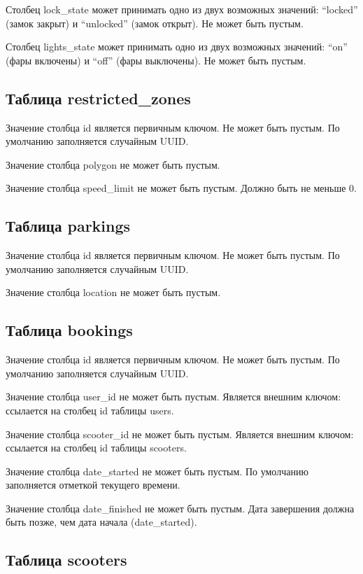 Столбец lock\_state может принимать одно из двух возможных значений: \enquote{locked} (замок закрыт) и \enquote{unlocked} (замок открыт). Не может быть пустым.

Столбец lights\_state может принимать одно из двух возможных значений: \enquote{on} (фары включены) и \enquote{off} (фары выключены). Не может быть пустым.

\subsection*{Таблица restricted\_zones}

Значение столбца id является первичным ключом. Не может быть пустым. По умолчанию заполняется случайным UUID.

Значение столбца polygon не может быть пустым.

Значение столбца speed\_limit не может быть пустым. Должно быть не меньше 0.

\subsection*{Таблица parkings}

Значение столбца id является первичным ключом. Не может быть пустым. По умолчанию заполняется случайным UUID.

Значение столбца location не может быть пустым.

\subsection*{Таблица bookings}

Значение столбца id является первичным ключом. Не может быть пустым. По умолчанию заполняется случайным UUID.

Значение столбца user\_id не может быть пустым. Является внешним ключом: ссылается на столбец id таблицы users.

Значение столбца scooter\_id не может быть пустым. Является внешним ключом: ссылается на столбец id таблицы scooters.

Значение столбца date\_started не может быть пустым. По умолчанию заполняется отметкой текущего времени.

Значение столбца date\_finished не может быть пустым. Дата завершения должна быть позже, чем дата начала (date\_started).

\subsection*{Таблица scooters}

